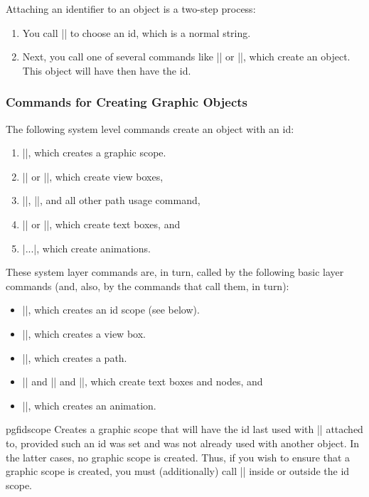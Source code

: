 Attaching an identifier to an object is a two-step process:
%
\begin{enumerate}
    \item You call || to choose an id, which is a normal
        string.
    \item Next, you call one of several commands like |\pgfidscope| or
        |\pgftext|, which create an object. This object will have then have the
        id.
\end{enumerate}


\subsubsection{Commands for Creating Graphic Objects}

The following system level commands create an object with an id:
%
\begin{enumerate}
    \item |\pgfsys@begin@idscope|, which creates a graphic scope.
    \item |\pgfsys@viewboxmeet| or |\pgfsys@viewboxslice|, which create view
        boxes,
    \item |\pgfsys@fill|, |\pgfsys@stroke|, and all other path usage command,
    \item |\pgfsys@hbox| or |\pgfsys@hboxsynced|, which create text boxes, and
    \item |\pgfsys@animate...|, which create animations.
\end{enumerate}

These system layer commands are, in turn, called by the following basic layer
commands (and, also, by the commands that call them, in turn):
%
\begin{itemize}
    \item |\pgfidscope|, which creates an id scope (see below).
    \item |\pgfviewboxscope|, which creates a view box.
    \item |\pgfusepath|, which creates a path.
    \item |\pgftext| and |\pgfnode| and |\pgfmultipartnode|, which create text
        boxes and nodes, and
    \item |\pgfanimateattribute|, which creates an animation.
\end{itemize}

\begin{environment}{{pgfidscope}}
    Creates a graphic scope that will have the id last used with |\pgfuseid|
    attached to, provided such an id was set and was not already used with
    another object. In the latter cases, no graphic scope is created. Thus, if
    you wish to ensure that a graphic scope is created, you must (additionally)
    call |\pgfscope| inside or outside the id scope.
\end{environment}

